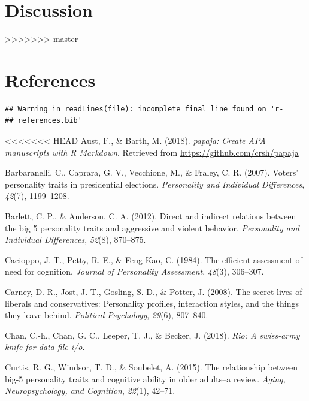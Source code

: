 \documentclass[man]{apa6}
\begin{document}
\hypertarget{discussion}{%
\section{Discussion}\label{discussion}}
>>>>>>> master

\newpage

\hypertarget{references}{%
\section{References}\label{references}}

\begin{verbatim}
## Warning in readLines(file): incomplete final line found on 'r-
## references.bib'
\end{verbatim}

\begingroup
\setlength{\parindent}{-0.5in}
\setlength{\leftskip}{0.5in}

\hypertarget{refs}{}
<<<<<<< HEAD
\hypertarget{ref-R-papaja}{}
Aust, F., \& Barth, M. (2018). \emph{papaja: Create APA manuscripts with
R Markdown}. Retrieved from \url{https://github.com/crsh/papaja}

\hypertarget{ref-barbaranelli2007voters}{}
Barbaranelli, C., Caprara, G. V., Vecchione, M., \& Fraley, C. R.
(2007). Voters' personality traits in presidential elections.
\emph{Personality and Individual Differences}, \emph{42}(7), 1199--1208.

\hypertarget{ref-barlett2012direct}{}
Barlett, C. P., \& Anderson, C. A. (2012). Direct and indirect relations
between the big 5 personality traits and aggressive and violent
behavior. \emph{Personality and Individual Differences}, \emph{52}(8),
870--875.

\hypertarget{ref-cacioppo1984efficient}{}
Cacioppo, J. T., Petty, R. E., \& Feng Kao, C. (1984). The efficient
assessment of need for cognition. \emph{Journal of Personality
Assessment}, \emph{48}(3), 306--307.

\hypertarget{ref-carney2008secret}{}
Carney, D. R., Jost, J. T., Gosling, S. D., \& Potter, J. (2008). The
secret lives of liberals and conservatives: Personality profiles,
interaction styles, and the things they leave behind. \emph{Political
Psychology}, \emph{29}(6), 807--840.

\hypertarget{ref-R-rio}{}
Chan, C.-h., Chan, G. C., Leeper, T. J., \& Becker, J. (2018).
\emph{Rio: A swiss-army knife for data file i/o}.

\hypertarget{ref-curtis2015relationship}{}
Curtis, R. G., Windsor, T. D., \& Soubelet, A. (2015). The relationship
between big-5 personality traits and cognitive ability in older
adults--a review. \emph{Aging, Neuropsychology, and Cognition},
\emph{22}(1), 42--71.
\end{document}

